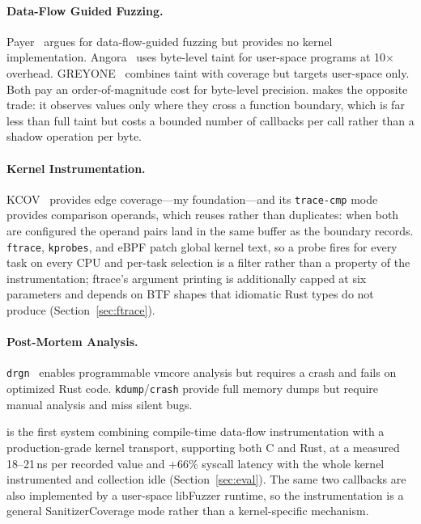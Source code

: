 \documentclass{article}
\begin{document}
\paragraph{Data-Flow Guided Fuzzing.}
Payer~\cite{payer2019dataflow} argues for data-flow-guided fuzzing but provides
no kernel implementation. Angora~\cite{chen2018angora} uses byte-level taint for
user-space programs at 10$\times$ overhead.
GREYONE~\cite{gan2020greyone} combines taint with coverage but targets
user-space only. Both pay an order-of-magnitude cost for byte-level precision.
\toolname{} makes the opposite trade: it observes values only where they cross
a function boundary, which is far less than full taint but costs a bounded
number of callbacks per call rather than a shadow operation per byte.

\paragraph{Kernel Instrumentation.}
KCOV~\cite{vyukov2016kcov} provides edge coverage---my foundation---and its
\texttt{trace-cmp} mode provides comparison operands, which \toolname{} reuses
rather than duplicates: when both are configured the operand pairs land in the
same buffer as the boundary records. \texttt{ftrace}, \texttt{kprobes}, and
eBPF patch global kernel text, so a probe fires for every task on every CPU and
per-task selection is a filter rather than a property of the instrumentation;
ftrace's argument printing is additionally capped at six parameters and depends
on BTF shapes that idiomatic Rust types do not produce
(Section~\ref{sec:ftrace}).

\paragraph{Post-Mortem Analysis.}
\texttt{drgn}~\cite{drgn} enables programmable vmcore analysis but requires a
crash and fails on optimized Rust code. \texttt{kdump}/\texttt{crash} provide
full memory dumps but require manual analysis and miss silent bugs.

\medskip\noindent
\toolname{} is the first system combining compile-time data-flow instrumentation
with a production-grade kernel transport, supporting both C and Rust, at a
measured 18--21\,ns per recorded value and +66\% syscall latency with the
whole kernel instrumented and collection idle
(Section~\ref{sec:eval}). The same two callbacks are also implemented by a
user-space libFuzzer runtime, so the instrumentation is a general
SanitizerCoverage mode rather than a kernel-specific mechanism.
\end{document}
